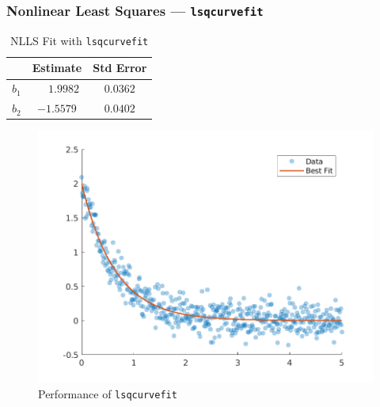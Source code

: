 \documentclass[11pt,xcolor={svgnames},aspectratio=169,usepdftitle=false,notheorems]{beamer}
\begin{document}
\begin{frame}
\frametitle{Nonlinear Least Squares --- \texttt{lsqcurvefit}}
\begin{minipage}{0.45\textwidth}
    \begin{table}[htbp]
    \caption{NLLS Fit with \texttt{lsqcurvefit}}
    \begin{tabular}{@{}lcc@{}}
    \toprule
    & Estimate & Std Error \\
    \midrule
    $b_1$                   & $\phantom{-}1.9982$   & $0.0362$  \\
    $b_2$                   & $-1.5579$  & $0.0402$   \\
    \bottomrule
    \end{tabular}
    \end{table}
\end{minipage}
\begin{minipage}[r]{0.45\textwidth}
\begin{figure}
  \centering
  \includegraphics[width = \textwidth]{../figures/lsqcurvefit_performance.png}
  \caption{Performance of \texttt{lsqcurvefit}}
  \label{fig:lsqcurvefit_performance}
\end{figure}
\end{minipage}
\end{frame}
\end{document}
